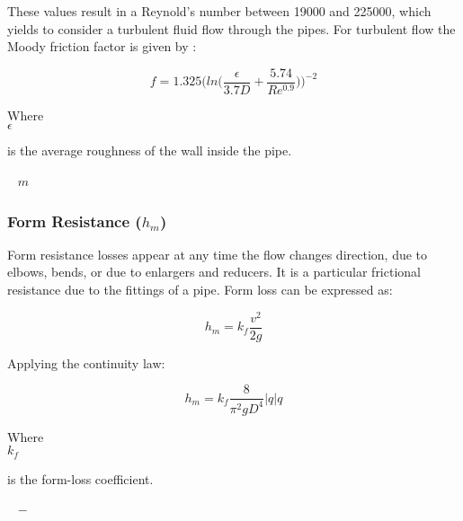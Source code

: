 These values result in a Reynold's number between 19000 and 225000, which yields to consider a turbulent fluid flow through the pipes. For turbulent flow the 
Moody friction factor is given by \cite{Design_Water}: 

\begin{equation}
  f = 1.325 \bigg(ln\bigg(\frac{\epsilon}{3.7 D}+\frac{5.74}{Re^{0.9}}\bigg)\bigg)^{-2}
  \label{turbulent}
\end{equation}

\begin{minipage}[t]{0.20\textwidth}
Where\\
\hspace*{8mm} $\epsilon$ 
\end{minipage}
\begin{minipage}[t]{0.68\textwidth}
\vspace*{2mm}
is the average roughness of the wall inside the pipe.
 \end{minipage}
\begin{minipage}[t]{0.10\textwidth}
\vspace*{2mm}
\textcolor{White}{te}$\unit{m}$
\end{minipage}

%
\subsubsection{Form Resistance (\texorpdfstring{$h_m$}{})} 
Form resistance losses appear at any time the flow changes direction, due to elbows, bends,
or due to enlargers and reducers. It is a particular frictional resistance due to the 
fittings of a pipe. Form loss can be expressed as:

\begin{equation}
  h_m = k_f \frac{v^2}{2g}
\end{equation}


Applying the continuity law:

\begin{equation}
   h_m = k_f \frac{8}{\pi^2gD^4}  |q| q
\label{Formloss}
\end{equation}

 \begin{minipage}[t]{0.20\textwidth}
Where\\
\hspace*{8mm} $k_f$ 
\end{minipage}
\begin{minipage}[t]{0.68\textwidth}
\vspace*{2mm}
is the form-loss coefficient.  
 \end{minipage}
\begin{minipage}[t]{0.10\textwidth}
\vspace*{2mm}
\textcolor{White}{te}$\unit{-}$
\end{minipage}

